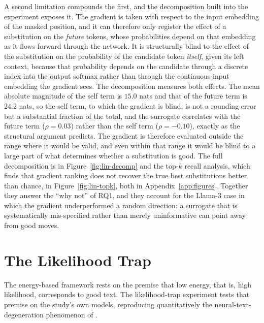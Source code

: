 A second limitation compounds the first, and the decomposition built into the experiment exposes it. The gradient is taken with respect to the input embedding of the masked position, and it can therefore only register the effect of a substitution on the \emph{future} tokens, whose probabilities depend on that embedding as it flows forward through the network. It is structurally blind to the effect of the substitution on the probability of the candidate token \emph{itself}, given its left context, because that probability depends on the candidate through a discrete index into the output softmax rather than through the continuous input embedding the gradient sees. The decomposition measures both effects. The mean absolute magnitude of the self term is $15.0$ nats and that of the future term is $24.2$ nats, so the self term, to which the gradient is blind, is not a rounding error but a substantial fraction of the total, and the surrogate correlates with the future term ($\rho = 0.03$) rather than the self term ($\rho = -0.10$), exactly as the structural argument predicts.
The gradient is therefore evaluated outside the range where it would be valid, and even within that range it would be blind to a large part of what determines whether a substitution is good. The full decomposition is in Figure~\ref{fig:lin-decomp} and the top-$k$ recall analysis, which finds that gradient ranking does not recover the true best substitutions better than chance, in Figure~\ref{fig:lin-topk}, both in Appendix~\ref{app:figures}. Together they answer the ``why not'' of RQ1, and they account for the Llama-3 case in which the gradient underperformed a random direction: a surrogate that is systematically mis-specified rather than merely uninformative can point away from good moves.

\section{The Likelihood Trap}
\label{sec:results-trap}

The energy-based framework rests on the premise that low energy, that is, high likelihood, corresponds to good text. The likelihood-trap experiment tests that premise on the study's own models, reproducing quantitatively the neural-text-degeneration phenomenon of \citet{holtzman2020curious}.

